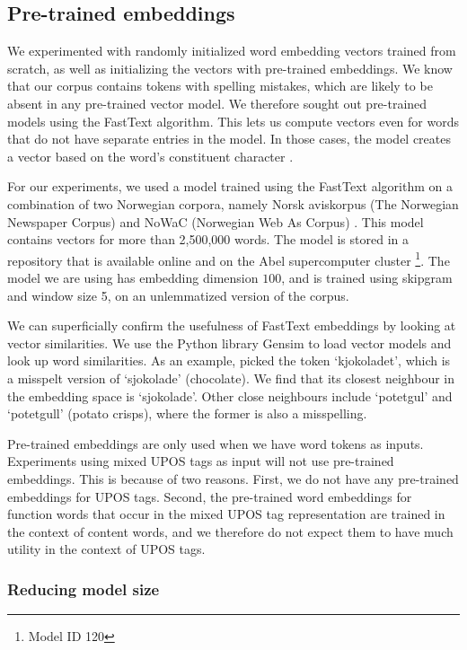 \subsection{Pre-trained embeddings} \label{subseq:fasttext}

We experimented with randomly initialized word embedding vectors trained from
scratch, as well as initializing the vectors with pre-trained embeddings. We
know that our corpus contains tokens with spelling mistakes, which are likely
to be absent in any pre-trained vector model. We therefore sought out
pre-trained models using the FastText algorithm. This lets us compute
vectors even for words that do not have separate entries in the model. In
those cases, the model creates a vector based on the word's constituent
character \ngrams.

For our experiments, we used a model trained using the FastText algorithm on
a combination of two Norwegian corpora, namely Norsk aviskorpus (The
Norwegian Newspaper Corpus) and NoWaC (Norwegian Web As Corpus)
\autocite{stadsnes2018}. This model contains vectors for more than 2,500,000
words. The model is stored in a repository that is available online and on
the Abel supercomputer cluster \autocite{murhaf2017repository}\footnote{Model
ID 120}. The model we are using has embedding dimension $100$, and is trained
using skipgram and window size 5, on an unlemmatized version of the corpus.

We can superficially confirm the usefulness of FastText embeddings by looking
at vector similarities. We use the Python library Gensim \autocite{gensim} to
load vector models and look up word similarities. As an example, picked the
token `kjokoladet', which is a misspelt version of `sjokolade' (chocolate).
We find that its closest neighbour in the embedding space is `sjokolade'.
Other close neighbours include `potetgul' and `potetgull' (potato crisps),
where the former is also a misspelling.

Pre-trained embeddings are only used when we have word tokens as inputs.
Experiments using mixed UPOS tags as input will not use pre-trained
embeddings. This is because of two reasons. First, we do not have any
pre-trained embeddings for UPOS tags. Second, the pre-trained word embeddings
for function words that occur in the mixed UPOS tag representation are
trained in the context of content words, and we therefore do not expect them
to have much utility in the context of UPOS tags.


\subsubsection{Reducing model size}

